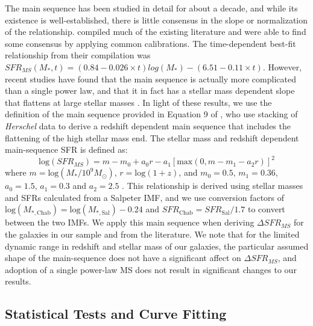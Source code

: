 \documentclass[a4paper,fleqn,usenatbib]{mnras}
\begin{document}
The main sequence has been studied in detail for about a decade, and while its existence is well-established, there is little consensus in the slope or normalization of the relationship. \citet{2014ApJS..214...15S} compiled much of the existing literature and were able to find some consensus by applying common calibrations. The time-dependent best-fit relationship from their compilation was $SFR_{MS}(M_{*}, t) =  (0.84 - 0.026 \times t) log(M_{*}) - (6.51 - 0.11 \times t)$. However, recent studies have found that the main sequence is actually more complicated than a single power law, and that it in fact has a stellar mass dependent slope that flattens at large stellar masses \citep{2012ApJ...754L..29W,2014ApJ...795..104W,2015ApJ...801...80L,2016ApJ...817..118T}.  In light of these results, we use the definition of the main sequence provided in Equation 9 of \citet{2015A&A...575A..74S}, who use stacking of {\em Herschel} data to derive a redshift dependent main sequence that includes the flattening of the high stellar mass end.  The stellar mass and redshift dependent main-sequence SFR is defined as:
\begin{equation*}
\mathrm{log}(SFR_{MS}) = m - m_{0} + a_{0}r - a_{1}[\mathrm{max}(0, m - m_{1} - a_{2}r)]^{2}
\end{equation*} 
where $m = \mathrm{log}(M_{*}/10^{9} M_{\odot})$, $r = \mathrm{log}(1+z)$, and $m_{0} = 0.5$, $m_{1} = 0.36$, $a_{0} = 1.5$, $a_{1} = 0.3$ and $a_{2} = 2.5$ \citep{2015A&A...575A..74S}. This relationship is derived using stellar masses and SFRs calculated from a Salpeter IMF, and we use conversion factors of $\mathrm{log}(M_{*, \mathrm{Chab}}) = \mathrm{log}(M_{*, \mathrm{Sal}}) - 0.24$ \citep{2013MNRAS.435...87M} and $SFR_{\mathrm{Chab}} = SFR_{\mathrm{Sal}} / 1.7$ \citep{2012ApJ...757...54Z} to convert between the two IMFs. We apply this main sequence when deriving $\Delta SFR_{MS} $ for the galaxies in our sample and from the literature. We note that for the limited dynamic range in redshift and stellar mass of our galaxies, the particular assumed shape of the main-sequence does not have a significant affect on $\Delta SFR_{MS}$, and adoption of a single power-law MS \citep[e.g. from][]{2014ApJS..214...15S} does not result in significant changes to our results.



\subsection{Statistical Tests and Curve Fitting}
\end{document}
